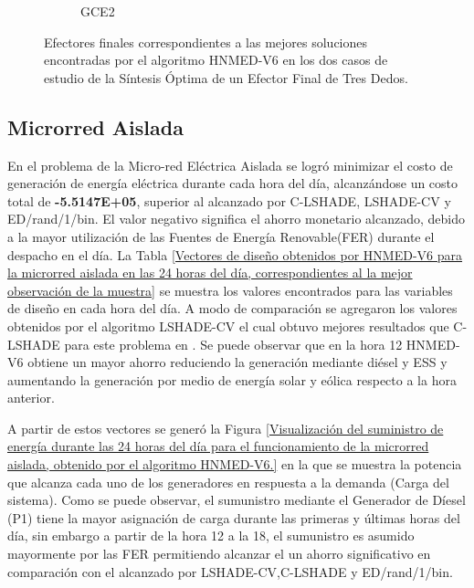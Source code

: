 \begin{figure}
\begin{subfigure}[b]{0.49\linewidth}
		\caption{GCE2} \label{fig:G2} 
	\end{subfigure}
	\caption{Efectores finales  correspondientes a las mejores soluciones encontradas por el algoritmo HNMED-V6 en los
		dos casos de estudio de la Síntesis Óptima de un Efector Final de Tres Dedos.} \label{fig: Efectores finales  correspondientes a las mejores soluciones encontradas por el algoritmo HNMED-V6 en los dos casos de estudio de la Síntesis Óptima de un Efector Final de Tres Dedos.} 
\end{figure}	

\subsection{Microrred Aislada}

En el problema de la Micro-red Eléctrica Aislada se logró minimizar el costo de generación de energía eléctrica durante cada hora del día, alcanzándose un costo total de \textbf{-5.5147E+05}, superior al alcanzado por C-LSHADE, LSHADE-CV y ED/rand/1/bin. El valor negativo significa el ahorro monetario alcanzado, debido a la mayor utilización de las Fuentes de Energía Renovable(FER) durante el despacho en el día.
La Tabla \ref{Vectores de diseño obtenidos por HNMED-V6 para la microrred aislada en las 24 horas del día, correspondientes al la mejor observación de la muestra} se muestra los valores encontrados para las variables de
diseño en cada hora del día. A modo de comparación se agregaron los valores obtenidos por el algoritmo LSHADE-CV el cual obtuvo mejores resultados que C-LSHADE para este problema en \cite{zapata_zapata_control_2017}. Se puede observar que en la hora 12 HNMED-V6 obtiene un mayor ahorro reduciendo la generación mediante diésel y ESS y aumentando la generación por medio de energía solar y eólica respecto a la hora anterior. 

A partir de estos vectores se generó la Figura \ref{Visualización del suministro de energía durante las 24 horas del día para el funcionamiento de la microrred aislada, obtenido por el algoritmo HNMED-V6.} en la que se muestra la potencia que alcanza cada uno de los generadores en respuesta a la demanda (Carga del sistema). Como se puede observar, el sumunistro mediante el Generador de Díesel (P1) tiene la mayor asignación de carga durante las primeras  y últimas horas del día, sin embargo a partir de la hora 12 a la 18, el sumunistro es asumido mayormente por las FER permitiendo alcanzar el un ahorro significativo en comparación con el alcanzado por LSHADE-CV,C-LSHADE y ED/rand/1/bin.

